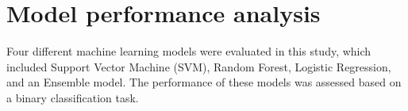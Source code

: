 \documentclass[12pt]{report}
\begin{document}




\section*{Model performance analysis}
Four different machine learning models were evaluated in this study, which
included Support Vector Machine (SVM), Random Forest, Logistic Regression, and
an Ensemble model. The performance of these models was assessed based on a
binary classification task.\\
\end{document}
